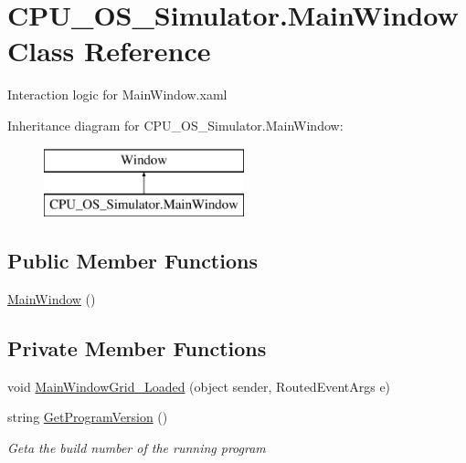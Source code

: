 \hypertarget{class_c_p_u___o_s___simulator_1_1_main_window}{}\section{C\+P\+U\+\_\+\+O\+S\+\_\+\+Simulator.\+Main\+Window Class Reference}
\label{class_c_p_u___o_s___simulator_1_1_main_window}


Interaction logic for Main\+Window.\+xaml  


Inheritance diagram for C\+P\+U\+\_\+\+O\+S\+\_\+\+Simulator.\+Main\+Window\+:\begin{figure}[H]
\begin{center}
\leavevmode
\includegraphics[height=2.000000cm]{class_c_p_u___o_s___simulator_1_1_main_window}
\end{center}
\end{figure}
\subsection*{Public Member Functions}
\begin{DoxyCompactItemize}
\item 
\hyperlink{class_c_p_u___o_s___simulator_1_1_main_window_a33462505a86657583c1560cbf02172bd}{Main\+Window} ()
\end{DoxyCompactItemize}
\subsection*{Private Member Functions}
\begin{DoxyCompactItemize}
\item 
void \hyperlink{class_c_p_u___o_s___simulator_1_1_main_window_ae378a47ef8871a5ed0566310be7d8c46}{Main\+Window\+Grid\+\_\+\+Loaded} (object sender, Routed\+Event\+Args e)
\item 
string \hyperlink{class_c_p_u___o_s___simulator_1_1_main_window_a99cb5e507849facbb9f5f271736759f7}{Get\+Program\+Version} ()
\begin{DoxyCompactList}\small\item\em Geta the build number of the running program \end{DoxyCompactList}\end{DoxyCompactItemize}


